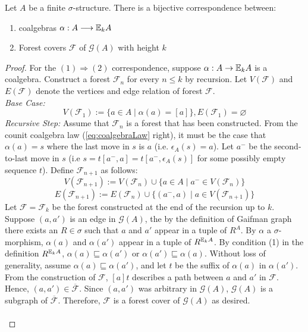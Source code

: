 \begin{prop}
Let $A$ be a finite $\sigma$-structure. There is a bijective correspondence between:
\begin{enumerate}[label=(\arabic*)]
\item coalgebras $\alpha:A \longrightarrow {\mathbb{E}_{k}A}$
\item Forest covers $\mathcal{F}$ of $\mathcal{G}(A)$ with height $k$ 
\end{enumerate}
\begin{proof}
For the $(1) \Rightarrow (2)$ correspondence, suppose $\alpha:A \rightarrow {\mathbb{E}_{k}A}$ is a coalgebra. Construct a forest $\mathcal{F}_{n}$ for every $n \leq k$ by recursion. Let $V(\mathcal{F})$ and $E(\mathcal{F})$ denote the vertices and edge relation of forest $\mathcal{F}$. \\
\textit{Base Case:} $$V(\mathcal{F}_{1}) := \{a \in A \mid \alpha(a) = [a]\}, E(\mathcal{F}_{1}) = \varnothing$$
\textit{Recursive Step:} Assume that $\mathcal{F}_{n}$ is a forest that has been constructed. From the counit coalgebra law (\ref{eq:coalgebraLaw} right), it must be the case that $\alpha(a) = s$ where the last move in $s$ is $a$ (i.e. $\epsilon_{A}(s) = a$). Let $a^{-}$ be the second-to-last move in $s$ (i.e $s = t[a^{-},a] = t[a^{-},\epsilon_{A}(s)]$ for some possibly empty sequence $t$). Define $\mathcal{F}_{n+1}$ as follows:  
$$V(\mathcal{F}_{n+1}) := V(\mathcal{F}_{n}) \cup \{a \in A \mid a^{-} \in V(\mathcal{F}_{n})\}$$
$$E(\mathcal{F}_{n+1}) := E(\mathcal{F}_{n}) \cup \{(a^{-},a) \mid a \in  V(\mathcal{F}_{n+1})\}$$ 
Let $\mathcal{F} = \mathcal{F}_{k}$ be the forest constructed at the end of the recursion up to $k$. Suppose $(a,a')$ is an edge in $\mathcal{G}(A)$, the by the definition of Gaifman graph there exists an $R \in \sigma$ such that $a$ and $a'$ appear in a tuple of $R^{A}$. By $\alpha$ a $\sigma$-morphism, $\alpha(a)$ and $\alpha(a')$ appear in a tuple of $R^{{\mathbb{E}_{k}A}}$. By condition (1) in the definition $R^{{\mathbb{E}_{k}A}}$, $\alpha(a) \sqsubseteq \alpha(a')$ or $\alpha(a') \sqsubseteq \alpha(a)$. Without loss of generality, assume $\alpha(a) \sqsubseteq \alpha(a')$, and let $t$ be the suffix of $\alpha(a)$ in $\alpha(a')$. From the construction of $\mathcal{F}$, $[a]t$ describes a path between $a$ and $a'$ in $\mathcal{F}$. Hence, $(a,a') \in \overline{\mathcal{F}}$. Since $(a,a')$ was arbitrary in $\mathcal{G}(A)$, $\mathcal{G}(A)$ is a subgraph of $\overline{\mathcal{F}}$. Therefore, $\mathcal{F}$ is a forest cover of $\mathcal{G}(A)$ as desired. \\~\\

\end{proof}
\end{prop}
